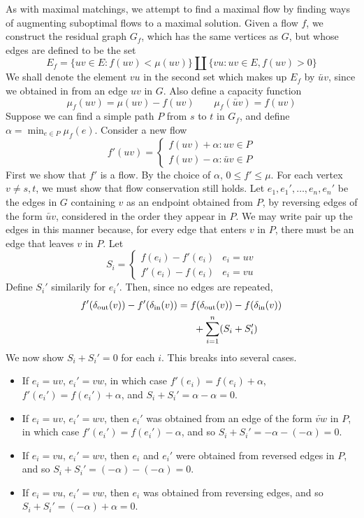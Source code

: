As with maximal matchings, we attempt to find a maximal flow by finding ways of augmenting suboptimal flows to a maximal solution. Given a flow $f$, we construct the residual graph $G_f$, which has the same vertices as $G$, but whose edges are defined to be the set
%
\[ E_f = \{ uv \in E : f(uv) < \mu(uv) \} \coprod \{ vu : uv \in E, f(uv) > 0 \} \]
%
We shall denote the element $vu$ in the second set which makes up $E_f$ by $\overleftarrow{uv}$, since we obtained in from an edge $uv$ in $G$. Also define a capacity function
%
\[ \mu_f(uv) = \mu(uv) - f(uv)\ \ \ \ \ \ \ \ \ \mu_f(\overleftarrow{uv}) = f(uv) \]
%
Suppose we can find a simple path $P$ from $s$ to $t$ in $G_f$, and define $\alpha = \min_{e \in P} \mu_f(e)$. Consider a new flow
%
\[ f'(uv) = \begin{cases} f(uv) + \alpha : uv \in P \\ f(uv) - \alpha : \overleftarrow{uv} \in P \end{cases} \]
%
First we show that $f'$ is a flow. By the choice of $\alpha$, $0 \leq f' \leq \mu$. For each vertex $v \neq s,t$, we must show that flow conservation still holds. Let $e_1, e_1', \dots, e_n, e_n'$ be the edges in $G$ containing $v$ as an endpoint obtained from $P$, by reversing edges of the form $\overleftarrow{uv}$, considered in the order they appear in $P$. We may write pair up the edges in this manner because, for every edge that enters $v$ in $P$, there must be an edge that leaves $v$ in $P$. Let
%
\[ S_i = \begin{cases} f(e_i) - f'(e_i) & e_i = uv \\ f'(e_i) - f(e_i) & e_i = vu \end{cases} \]
%
Define $S_i'$ similarily for $e_i'$. Then, since no edges are repeated,
%
\begin{align*}
    f'(\operatorname{\delta_{\text{out}}}(v)) - f'(\operatorname{\delta_{\text{in}}}(v)) &= f(\operatorname{\delta_{\text{out}}}(v)) - f(\operatorname{\delta_{\text{in}}}(v))\\
    &\ \ \ \ \ + \sum_{i = 1}^n (S_i + S_i')
\end{align*}
%
We now show $S_i + S_i' = 0$ for each $i$. This breaks into several cases.
%
\begin{itemize}
    \item If $e_i = uv$, $e_i' = vw$, in which case $f'(e_i) = f(e_i) + \alpha$, $f'(e_i') = f(e_i') + \alpha$, and $S_i + S_i' = \alpha - \alpha = 0$.
    \item If $e_i = uv$, $e_i' = wv$, then $e_i'$ was obtained from an edge of the form $\overleftarrow{vw}$ in $P$, in which case $f'(e_i') = f(e_i') - \alpha$, and so $S_i + S_i' = -\alpha -(-\alpha) = 0$.
    \item If $e_i = vu$, $e_i' = wv$, then $e_i$ and $e_i'$ were obtained from reversed edges in $P$, and so $S_i + S_i' = (-\alpha) - (-\alpha) = 0$.
    \item If $e_i = vu$, $e_i' = vw$, then $e_i$ was obtained from reversing edges, and so $S_i + S_i' = (-\alpha) + \alpha = 0$.
\end{itemize}
